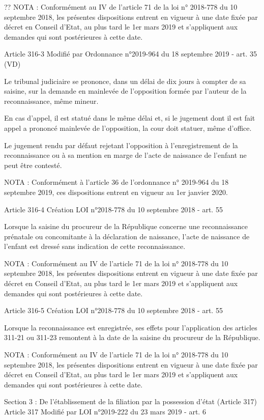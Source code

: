 \documentclass[
  12pt,
]{book}
\begin{document}
\begin{encadre}{??}
NOTA :
Conformément au IV de l'article 71 de la loi n° 2018-778 du 10 septembre 2018, les présentes dispositions entrent en vigueur à une date fixée par décret en Conseil d'Etat, au plus tard le 1er mars 2019 et s'appliquent aux demandes qui sont postérieures à cette date.

Article 316-3
Modifié par Ordonnance n°2019-964 du 18 septembre 2019 - art. 35 (VD)

Le tribunal judiciaire se prononce, dans un délai de dix jours à compter de sa saisine, sur la demande en mainlevée de l'opposition formée par l'auteur de la reconnaissance, même mineur.

En cas d'appel, il est statué dans le même délai et, si le jugement dont il est fait appel a prononcé mainlevée de l'opposition, la cour doit statuer, même d'office.

Le jugement rendu par défaut rejetant l'opposition à l'enregistrement de la reconnaissance ou à sa mention en marge de l'acte de naissance de l'enfant ne peut être contesté.

NOTA :
Conformément à l'article 36 de l'ordonnance n° 2019-964 du 18 septembre 2019, ces dispositions entrent en vigueur au 1er janvier 2020.

Article 316-4
Création LOI n°2018-778 du 10 septembre 2018 - art. 55

Lorsque la saisine du procureur de la République concerne une reconnaissance prénatale ou concomitante à la déclaration de naissance, l'acte de naissance de l'enfant est dressé sans indication de cette reconnaissance.

NOTA :
Conformément au IV de l'article 71 de la loi n° 2018-778 du 10 septembre 2018, les présentes dispositions entrent en vigueur à une date fixée par décret en Conseil d'Etat, au plus tard le 1er mars 2019 et s'appliquent aux demandes qui sont postérieures à cette date.

Article 316-5
Création LOI n°2018-778 du 10 septembre 2018 - art. 55

Lorsque la reconnaissance est enregistrée, ses effets pour l'application des articles 311-21 ou 311-23 remontent à la date de la saisine du procureur de la République.

NOTA :
Conformément au IV de l'article 71 de la loi n° 2018-778 du 10 septembre 2018, les présentes dispositions entrent en vigueur à une date fixée par décret en Conseil d'Etat, au plus tard le 1er mars 2019 et s'appliquent aux demandes qui sont postérieures à cette date.

Section 3 : De l'établissement de la filiation par la possession d'état (Article 317)
Article 317
Modifié par LOI n°2019-222 du 23 mars 2019 - art. 6


\end{encadre}
\end{document}
